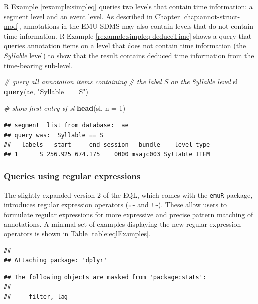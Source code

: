 \documentclass[]{book}
\newenvironment{Shaded}{\begin{snugshade}}{\end{snugshade}}
\newcommand{\CommentTok}[1]{\textcolor[rgb]{0.56,0.35,0.01}{\textit{#1}}}
\newcommand{\DataTypeTok}[1]{\textcolor[rgb]{0.13,0.29,0.53}{#1}}
\newcommand{\DecValTok}[1]{\textcolor[rgb]{0.00,0.00,0.81}{#1}}
\newcommand{\KeywordTok}[1]{\textcolor[rgb]{0.13,0.29,0.53}{\textbf{#1}}}
\newcommand{\NormalTok}[1]{#1}
\newcommand{\StringTok}[1]{\textcolor[rgb]{0.31,0.60,0.02}{#1}}
\theoremstyle{definition}
\theoremstyle{definition}
\theoremstyle{definition}
\theoremstyle{remark}
\begin{document}
R Example \ref{rexample:simpleq} queries two levels that contain time
information: a segment level and an event level. As described in Chapter
\ref{chap:annot-struct-mod}, annotations in the EMU-SDMS may also
contain levels that do not contain time information. R Example
\ref{rexample:simpleq-deduceTime} shows a query that queries annotation
items on a level that does not contain time information (the
\emph{Syllable} level) to show that the result contains deduced time
information from the time-bearing sub-level.

\begin{Shaded}
\begin{Highlighting}[]
\CommentTok{# query all annotation items containing}
\CommentTok{# the label S on the Syllable level}
\NormalTok{sl =}\StringTok{ }\KeywordTok{query}\NormalTok{(ae, }\StringTok{"Syllable == S"}\NormalTok{)}

\CommentTok{# show first entry of sl}
\KeywordTok{head}\NormalTok{(sl, }\DataTypeTok{n =} \DecValTok{1}\NormalTok{)}
\end{Highlighting}
\end{Shaded}

\begin{verbatim}
## segment  list from database:  ae 
## query was:  Syllable == S 
##   labels   start     end session   bundle    level type
## 1      S 256.925 674.175    0000 msajc003 Syllable ITEM
\end{verbatim}

\hypertarget{queries-using-regular-expressions}{%
\subsubsection{Queries using regular
expressions}\label{queries-using-regular-expressions}}

The slightly expanded version 2 of the EQL, which comes with the
\texttt{emuR} package, introduces regular expression operators
(\texttt{=\textasciitilde{}} and \texttt{!\textasciitilde{}}). These
allow users to formulate regular expressions for more expressive and
precise pattern matching of annotations. A minimal set of examples
displaying the new regular expression operators is shown in Table
\ref{table:eqlExamples}.

\begin{verbatim}
## 
## Attaching package: 'dplyr'
\end{verbatim}

\begin{verbatim}
## The following objects are masked from 'package:stats':
## 
##     filter, lag
\end{verbatim}
\end{document}
